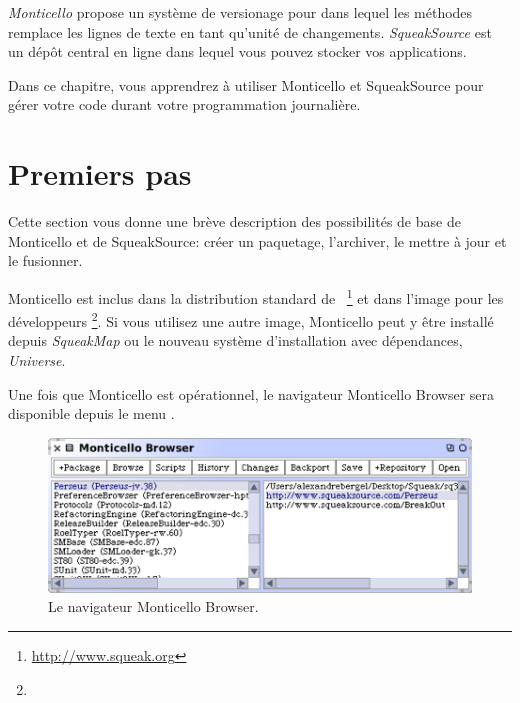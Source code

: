 \documentclass[a4paper,10pt,twoside]{book}
\begin{document}
\emph{Monticello} propose un syst\`eme de versionage pour \sq dans
lequel les m\'ethodes remplace les lignes de texte en tant qu'unit\'e
de changements. %
\emph{SqueakSource}  est un d\'ep\^ot central en ligne dans lequel
vous pouvez stocker vos applications.

Dans ce chapitre, vous apprendrez \`a utiliser Monticello et
SqueakSource pour g\'erer votre code durant votre programmation journali\`ere.


\section{Premiers pas} %

Cette section vous donne une br\`eve description des possibilit\'es de
base de Monticello et de SqueakSource: cr\'eer un paquetage,
l'archiver, le mettre \`a jour et le fusionner.

Monticello est inclus dans la distribution standard de
\sq~\footnote{\url{http://www.squeak.org}} et dans l'image pour les
d\'eveloppeurs \footnote{\squeakdev}. Si vous utilisez une autre
image, Monticello peut y \^etre install\'e depuis  \emph{SqueakMap} ou
le nouveau syst\`eme d'installation avec d\'ependances,
\emph{Universe}.

Une fois que Monticello est op\'erationnel, le navigateur Monticello
Browser sera disponible depuis le menu 
.

\begin{figure}[ht]\centering
	\includegraphics[width=.75\linewidth]{monticello}
	\caption{Le navigateur Monticello Browser.}
\end{figure}
\end{document}
